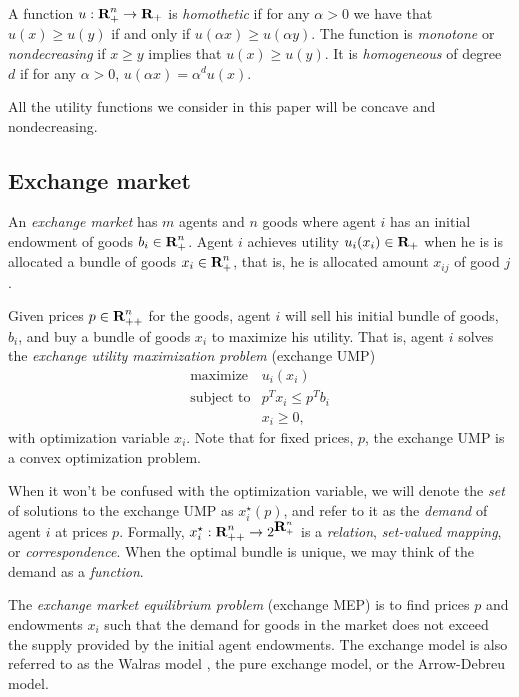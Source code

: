 \documentclass[12pt]{article}
\begin{document}
A function $u: {\mbox{\bf R}}^n_+ \to {\mbox{\bf R}}_+$ is \emph{homothetic} if for any $\alpha
> 0$ we have that $u(x) \geq u(y)$ if and only if $u(\alpha x) \geq u(\alpha
y)$. The function is \emph{monotone} or \emph{nondecreasing} if $x \geq y$
implies that $u(x) \geq u(y)$. It is \emph{homogeneous} of degree $d$ if for
any $\alpha > 0$, $u(\alpha x) = \alpha^d u(x)$.

All the utility functions we consider in this paper will be concave and
nondecreasing.

\subsection{Exchange market}
\label{sec:exchange_def}

An \emph{exchange market} has $m$ agents and $n$ goods where agent $i$ has an
initial endowment of goods $b_i \in {\mbox{\bf R}}_+^n$. Agent $i$ achieves utility
$u_i(x_i) \in {\mbox{\bf R}}_+$ when he is is allocated a bundle of goods $x_i \in
{\mbox{\bf R}}^n_{+}$, that is, he is allocated amount $x_{ij}$ of good $j$.

Given prices $p \in {\mbox{\bf R}}^n_{++}$ for the goods, agent $i$ will sell his
initial bundle of goods, $b_i$, and buy a bundle of goods $x_i$ to maximize his
utility. That is, agent $i$ solves the \emph{exchange utility maximization
problem} (exchange UMP)
\begin{equation}
\label{p-ump}
\begin{array}{ll}
\mbox{maximize} & u_i(x_i) \\
\mbox{subject to} & p^T x_i \leq p^T b_i \\
& x_i \geq 0,
\end{array}
\end{equation}
with optimization variable $x_i$. Note that for fixed prices, $p$, the exchange
UMP is a convex optimization problem.

When it won't be confused with the optimization variable, we will denote the
\emph{set} of solutions to the exchange UMP as $x^\star_i(p)$, and refer to it
as the \emph{demand} of agent $i$ at prices $p$.
Formally, $x_i^\star : {\mbox{\bf R}}^n_{++} \to 2^{{\mbox{\bf R}}^n_+}$ is a \emph{relation},
\emph{set-valued mapping}, or \emph{correspondence}. When the optimal bundle is
unique, we may think of the demand as a \emph{function}.

The \emph{exchange market equilibrium problem} (exchange MEP) is to find prices
$p$ and endowments $x_i$ such that the demand for goods in the market does not
exceed the supply provided by the initial agent endowments. The exchange model
is also referred to as the Walras model \cite{walras1896elements}, the pure
exchange model, or the Arrow-Debreu model.
\end{document}
